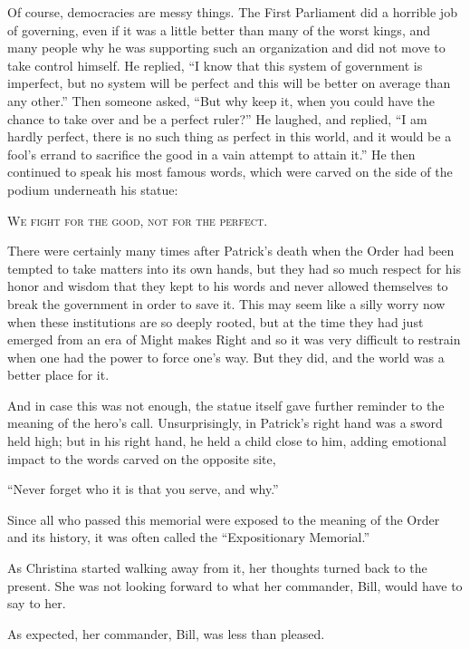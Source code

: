 \documentclass[showtrims,b6paper,draft,10pt]{memoir}
\begin{document}
Of course, democracies are messy things.  The First Parliament did a horrible job of governing, even if it was a little better than many of the worst kings, and many people why he was supporting such an organization and did not move to take control himself.  He replied, ``I know that this system of government is imperfect, but no system will be perfect and this will be better on average than any other.''  Then someone asked, ``But why keep it, when you could have the chance to take over and be a perfect ruler?''  He laughed, and replied, ``I am hardly perfect, there is no such thing as perfect in this world, and it would be a fool's errand to sacrifice the good in a vain attempt to attain it.''  He then continued to speak his most famous words, which were carved on the side of the podium underneath his statue:

\begin{center}
\textsc{We fight for the good, not for the perfect.}
\end{center}

There were certainly many times after Patrick's death when the Order had been tempted to take matters into its own hands, but they had so much respect for his honor and wisdom that they kept to his words and never allowed themselves to break the government in order to save it.  This may seem like a silly worry now when these institutions are so deeply rooted, but at the time they had just emerged from an era of Might makes Right and so it was very difficult to restrain when one had the power to force one's way.  But they did, and the world was a better place for it.

And in case this was not enough, the statue itself gave further reminder to the meaning of the hero's call.  Unsurprisingly, in Patrick's right hand was a sword held high;  but in his right hand, he held a child close to him, adding emotional impact to the words carved on the opposite site,

``Never forget who it is that you serve, and why.''

Since all who passed this memorial were exposed to the meaning of the Order and its history, it was often called the ``Expositionary Memorial.''

As Christina started walking away from it, her thoughts turned back to the present.  She was not looking forward to what her commander, Bill, would have to say to her.

\timeskip

As expected, her commander, Bill, was less than pleased.
\end{document}
